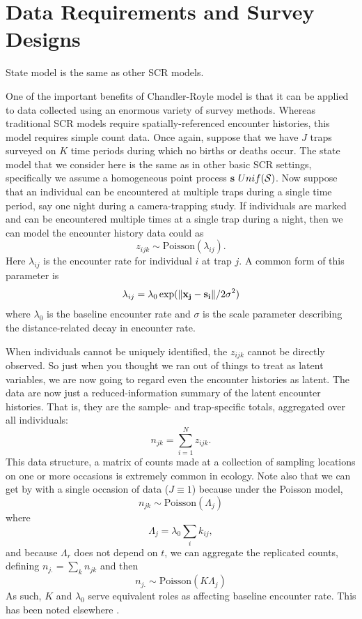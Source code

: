 \section{Data Requirements and Survey Designs}




State model is the same as other SCR models.


One of the important benefits of Chandler-Royle model is that it
can be applied to data collected using an enormous variety of survey
methods. Whereas traditional SCR models require spatially-referenced
encounter histories, this model requires simple count data. Once
again, suppose that we have $J$ traps surveyed on $K$ time periods
during which no births or deaths occur. The state model that we
consider here is the same as in other basic SCR settings, specifically
we assume a homogeneous point process ${\bf s} ~ Unif(\cal{S})$.
Now suppose that an
individual can be encountered at multiple traps during a single time
period, say one night during a camera-trapping study. If individuals
are marked and
can be encountered multiple times at a single trap during a
night, then we can model the encounter history data could as
\begin{equation}
 z_{ijk} \sim \mbox{Poisson}(\lambda_{ij}).
\label{eq.latentPoisson}
\end{equation}
Here $\lambda_{ij}$ is the encounter rate
for individual $i$ at trap $j$. A common form of this parameter is
\[
\lambda_{ij} = \lambda_0 \exp(\| {\bf x_j - s_i} \| / 2\sigma^2)
\]
where $\lambda_0$ is the baseline encounter rate and $\sigma$ is the
scale parameter describing the distance-related decay in encounter
rate.

When individuals cannot be uniquely identified, the $z_{ijk}$ cannot
be directly observed. So just when you thought we ran out of things to
treat as latent variables, we are now going to regard even the encounter
histories as latent. The data are now just a reduced-information
summary of the latent encounter histories. That is, they are the
sample- and trap-specific totals, aggregated over all individuals:
\[
n_{jk} = \sum_{i=1}^{N} z_{ijk}.
\]
This data structure, a matrix of counts made at a collection of
sampling locations on one or more occasions is extremely common in
ecology. Note also that we can get by with a single
occasion of data ($J \equiv 1$) because under the Poisson model,
\begin{equation}
n_{jk} \sim \mbox{Poisson}( \Lambda_{j} )
\label{eq:nagg}
\end{equation}
where
\[
 \Lambda_{j} = \lambda_0 \sum_{i} k_{ij},
\]
and because $\Lambda_r$ does not depend on $t$, we can
aggregate the replicated counts, defining
$n_{j.} = \sum_{k} n_{jk}$ and then
\[
 n_{j.} \sim \mbox{Poisson}( K \Lambda_{j} )
\]
As such, $K$ and $\lambda_{0}$ serve equivalent roles as affecting
baseline encounter rate. This has been noted elsewhere
\citep{efford_etal:2009}.


